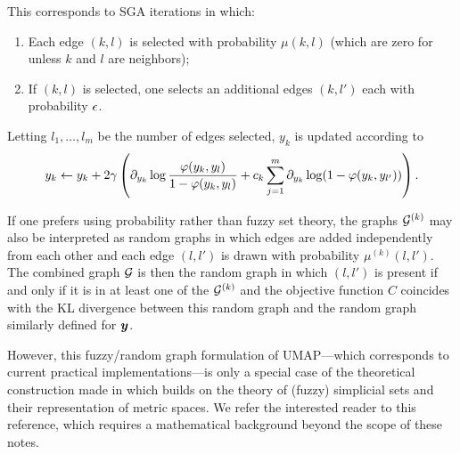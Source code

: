  This corresponds to SGA iterations in which: 
\begin{enumerate}
\item Each edge $(k,l)$ is selected with probability $\mu(k,l)$ (which are zero for unless $k$ and $l$ are neighbors); 
\item If $(k,l)$ is selected, one selects an additional edges $(k,l')$ each with probability $\epsilon$.
\end{enumerate} 
Letting $l_1, \ldots, l_m$ be the number of edges selected,  $y_k$ is updated according to
\[
y_k \leftarrow y_k + 2\gamma \left(\partial_{y_k} \log\frac{\varphi(y_k, y_{l})}{1-\varphi(y_k, y_{l})} + c_k \sum_{j=1}^m 
\partial_{y_k} \log(1-\varphi(y_k, y_{l'}))\right).
\]

\begin{remark}
If one prefers using probability rather than fuzzy set theory, the graphs ${\mathcal G}^{(k)}$ may also be interpreted as random graphs in which edges are added independently from each other and each edge $(l,l')$  is drawn with probability $\mu^{(k)}(l,l')$. The combined graph ${\mathcal G}$ is then the random graph in which $(l,l')$ is present if and only if it is in at least one of the ${\mathcal G}^{(k)}$ and the objective function $C$ coincides with the KL divergence between this random graph and the random graph similarly defined for ${\bm{y}}$.

However, this fuzzy/random graph formulation of UMAP---which corresponds to current practical implementations---is only a special case of the theoretical construction made in \citet{mcinnes2020umap} which builds on the theory of (fuzzy) simplicial sets and their representation of metric spaces.  We refer the interested reader to this reference, which requires a mathematical background beyond the scope of these notes. 
\end{remark}

